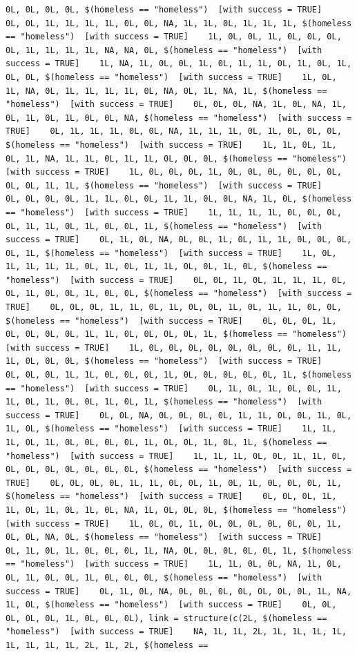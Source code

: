 \documentclass{tufte-book}\usepackage[]{graphicx}\usepackage[]{xcolor}
\makeatletter
\newenvironment{kframe}{%
 \def\at@end@of@kframe{}%
 \ifinner\ifhmode%
  \def\at@end@of@kframe{\end{minipage}}%
  \begin{minipage}{\columnwidth}%
 \fi\fi%
 \def\FrameCommand##1{\hskip\@totalleftmargin \hskip-\fboxsep
 \colorbox{shadecolor}{##1}\hskip-\fboxsep
     \hskip-\linewidth \hskip-\@totalleftmargin \hskip\columnwidth}%
 \MakeFramed {\advance\hsize-\width
   \@totalleftmargin\z@ \linewidth\hsize
   \@setminipage}}%
 {\par\unskip\endMakeFramed%
 \at@end@of@kframe}
\newenvironment{knitrout}{}{} %
\makeatother
\begin{document}
\begin{knitrout}
\begin{kframe}
\begin{verbatim}
0L, 0L, 0L, 0L, $(homeless == "homeless")  [with success = TRUE]    0L, 0L, 1L, 1L, 1L, 1L, 0L, 0L, NA, 1L, 1L, 0L, 1L, 1L, 1L, $(homeless == "homeless")  [with success = TRUE]    1L, 0L, 0L, 1L, 0L, 0L, 0L, 0L, 1L, 1L, 1L, 1L, NA, NA, 0L, $(homeless == "homeless")  [with success = TRUE]    1L, NA, 1L, 0L, 0L, 1L, 0L, 1L, 1L, 0L, 1L, 0L, 1L, 0L, 0L, $(homeless == "homeless")  [with success = TRUE]    1L, 0L, 1L, NA, 0L, 1L, 1L, 1L, 1L, 0L, NA, 0L, 1L, NA, 1L, $(homeless == "homeless")  [with success = TRUE]    0L, 0L, 0L, NA, 1L, 0L, NA, 1L, 0L, 1L, 0L, 1L, 0L, 0L, NA, $(homeless == "homeless")  [with success = TRUE]    0L, 1L, 1L, 1L, 0L, 0L, NA, 1L, 1L, 1L, 0L, 1L, 0L, 0L, 0L, $(homeless == "homeless")  [with success = TRUE]    1L, 1L, 0L, 1L, 0L, 1L, NA, 1L, 1L, 0L, 1L, 1L, 0L, 0L, 0L, $(homeless == "homeless")  [with success = TRUE]    1L, 0L, 0L, 0L, 1L, 0L, 0L, 0L, 0L, 0L, 0L, 0L, 0L, 1L, 1L, $(homeless == "homeless")  [with success = TRUE]    0L, 0L, 0L, 0L, 1L, 1L, 0L, 0L, 1L, 1L, 0L, 0L, NA, 1L, 0L, $(homeless == "homeless")  [with success = TRUE]    1L, 1L, 1L, 1L, 0L, 0L, 0L, 0L, 1L, 1L, 0L, 1L, 0L, 0L, 1L, $(homeless == "homeless")  [with success = TRUE]    0L, 1L, 0L, NA, 0L, 0L, 1L, 0L, 1L, 1L, 0L, 0L, 0L, 0L, 1L, $(homeless == "homeless")  [with success = TRUE]    1L, 0L, 1L, 1L, 1L, 1L, 0L, 1L, 0L, 1L, 1L, 0L, 0L, 1L, 0L, $(homeless == "homeless")  [with success = TRUE]    0L, 0L, 1L, 0L, 1L, 1L, 1L, 0L, 0L, 1L, 0L, 0L, 1L, 0L, 0L, $(homeless == "homeless")  [with success = TRUE]    0L, 0L, 0L, 1L, 1L, 0L, 1L, 0L, 0L, 1L, 0L, 1L, 1L, 0L, 0L, $(homeless == "homeless")  [with success = TRUE]    0L, 0L, 0L, 1L, 0L, 0L, 0L, 0L, 1L, 1L, 0L, 0L, 0L, 0L, 1L, $(homeless == "homeless")  [with success = TRUE]    1L, 0L, 0L, 0L, 0L, 0L, 0L, 0L, 0L, 1L, 1L, 1L, 0L, 0L, 0L, $(homeless == "homeless")  [with success = TRUE]    0L, 0L, 0L, 1L, 1L, 0L, 0L, 0L, 1L, 0L, 0L, 0L, 0L, 0L, 1L, $(homeless == "homeless")  [with success = TRUE]    0L, 1L, 0L, 1L, 0L, 0L, 1L, 1L, 0L, 1L, 0L, 0L, 1L, 0L, 1L, $(homeless == "homeless")  [with success = TRUE]    0L, 0L, NA, 0L, 0L, 0L, 0L, 1L, 1L, 0L, 0L, 1L, 0L, 1L, 0L, $(homeless == "homeless")  [with success = TRUE]    1L, 1L, 1L, 0L, 1L, 0L, 0L, 0L, 0L, 1L, 0L, 0L, 1L, 0L, 1L, $(homeless == "homeless")  [with success = TRUE]    1L, 1L, 1L, 0L, 0L, 1L, 1L, 0L, 0L, 0L, 0L, 0L, 0L, 0L, 0L, $(homeless == "homeless")  [with success = TRUE]    0L, 0L, 0L, 0L, 1L, 1L, 0L, 0L, 1L, 0L, 1L, 0L, 0L, 0L, 1L, $(homeless == "homeless")  [with success = TRUE]    0L, 0L, 0L, 1L, 1L, 0L, 1L, 0L, 1L, 0L, NA, 1L, 0L, 0L, 0L, $(homeless == "homeless")  [with success = TRUE]    1L, 0L, 0L, 1L, 0L, 0L, 0L, 0L, 0L, 0L, 1L, 0L, 0L, NA, 0L, $(homeless == "homeless")  [with success = TRUE]    0L, 1L, 0L, 1L, 0L, 0L, 0L, 1L, NA, 0L, 0L, 0L, 0L, 0L, 1L, $(homeless == "homeless")  [with success = TRUE]    1L, 1L, 0L, 0L, NA, 1L, 0L, 0L, 1L, 0L, 0L, 1L, 0L, 0L, 0L, $(homeless == "homeless")  [with success = TRUE]    0L, 1L, 0L, NA, 0L, 0L, 0L, 0L, 0L, 0L, 0L, 1L, NA, 1L, 0L, $(homeless == "homeless")  [with success = TRUE]    0L, 0L, 0L, 0L, 0L, 1L, 0L, 0L, 0L), link = structure(c(2L, $(homeless == "homeless")  [with success = TRUE]    NA, 1L, 1L, 2L, 1L, 1L, 1L, 1L, 1L, 1L, 1L, 1L, 2L, 1L, 2L, $(homeless == 
\end{verbatim}
\end{kframe}
\end{knitrout}
\end{document}
